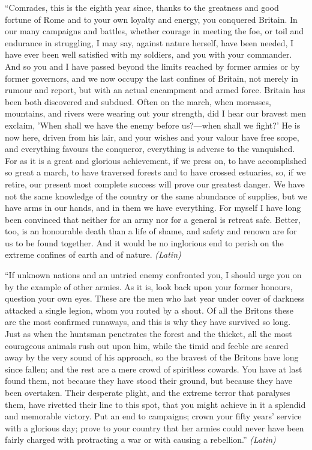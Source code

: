 ``Comrades, this is the eighth year since, thanks to the greatness and good fortune of Rome and to your own loyalty and energy, you conquered Britain. In our many campaigns and battles, whether courage in meeting the foe, or toil and endurance in struggling, I may say, against nature herself, have been needed, I have ever been well satisfied with my soldiers, and you with your commander. And so you and I have passed beyond the limits reached by former armies or by former governors, and we now occupy the last confines of Britain, not merely in rumour and report, but with an actual encampment and armed force. Britain has been both discovered and subdued. Often on the march, when morasses, mountains, and rivers were wearing out your strength, did I hear our bravest men exclaim, 'When shall we have the enemy before us?—when shall we fight?' He is now here, driven from his lair, and your wishes and your valour have free scope, and everything favours the conqueror, everything is adverse to the vanquished. For as it is a great and glorious achievement, if we press on, to have accomplished so great a march, to have traversed forests and to have crossed estuaries, so, if we retire, our present most complete success will prove our greatest danger. We have not the same knowledge of the country or the same abundance of supplies, but we have arms in our hands, and in them we have everything. For myself I have long been convinced that neither for an army nor for a general is retreat safe. Better, too, is an honourable death than a life of shame, and safety and renown are for us to be found together. And it would be no inglorious end to perish on the extreme confines of earth and of nature. \emph{(Latin)}


``If unknown nations and an untried enemy confronted you, I should urge you on by the example of other armies. As it is, look back upon your former honours, question your own eyes. These are the men who last year under cover of darkness attacked a single legion, whom you routed by a shout. Of all the Britons these are the most confirmed runaways, and this is why they have survived so long. Just as when the huntsman penetrates the forest and the thicket, all the most courageous animals rush out upon him, while the timid and feeble are scared away by the very sound of his approach, so the bravest of the Britons have long since fallen; and the rest are a mere crowd of spiritless cowards. You have at last found them, not because they have stood their ground, but because they have been overtaken. Their desperate plight, and the extreme terror that paralyses them, have rivetted their line to this spot, that you might achieve in it a splendid and memorable victory. Put an end to campaigns; crown your fifty years' service with a glorious day; prove to your country that her armies could never have been fairly charged with protracting a war or with causing a rebellion.'' \emph{(Latin)}

